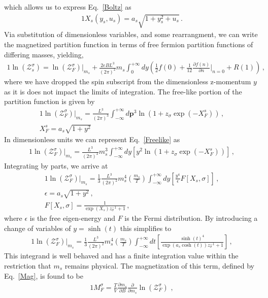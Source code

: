 \documentclass[
aps,
pra,
showpacs,
preprintnumbers,
amsmath,
amssymb,
footinbib
]{revtex4-2}
\newcommand*{\req}[1]{Eq.~{\eqref{#1}}}
\newcommand*{\bb}{\boldsymbol}
\begin{document}
which allows us to express \req{Boltz} as
\begin{alignat}{1}
    \label{UnitlessBoltz} X_{s}(y_{s},u_{s})=a_{s}\sqrt{1+y_{s}^{2}+u_{s}}\,.
\end{alignat}
Via substitution of dimensionless variables, and some rearrangment, we can write the magnetized partition function in terms of free fermion partition functions of differing masses, yielding,
\begin{alignat}{1}
    \label{Equality} \ln\left(\mathcal{Z}^{\sigma}_{s}\right) = \ln\left(\mathcal{Z}^{\sigma}_{F}\right)|_{m_{s}} + \frac{2eBL^{3}}{(2\pi)^{2}}m_{s}\int_{0}^{+\infty}dy\left(\frac{1}{2}f(0) + \frac{1}{12}\frac{\partial f(n)}{\partial n}\bigg\rvert_{n=0} + R(1)\right)\,,
\end{alignat}
where we have dropped the spin subscript from the dimensionless z-momentum $y$ as it is does not impact the limits of integration. The free-like portion of the partition function is given by
\begin{alignat}{1}
    \label{Freelike} \ln\left(\mathcal{Z}^{\sigma}_{F}\right)|_{m_{s}}=\frac{L^{3}}{(2\pi)^{3}}\int^{+\infty}_{-\infty}d\bb{p}^{3}\ln\left(1+z_{\sigma}\exp(-X^{s}_{F})\right)\,,\\
    \label{FreelikeHam} X^{s}_{F} = a_{s}\sqrt{1+y^{2}}
\end{alignat}
In dimensionless units we can represent \req{Freelike} as
\begin{alignat}{1}
    \label{FreelikeAlt} \ln\left(\mathcal{Z}^{\sigma}_{F}\right)|_{m_{s}}=\frac{L^{3}}{(2\pi)^{2}}m_{s}^{3}\int^{+\infty}_{-\infty}dy\left[y^{2}\ln\left(1+z_{\sigma}\exp(-X^{s}_{F})\right)\right]\,,
\end{alignat}
Integrating by parts, we arrive at
\begin{alignat}{1}
    \label{FreelikeParts} \ln\left(\mathcal{Z}^{\sigma}_{F}\right)|_{m_{s}}=\frac{1}{3}\frac{L^{3}}{(2\pi)^{2}}m_{s}^{4}\left(\frac{m_{s}}{T}\right)\int^{+\infty}_{-\infty}dy\left[\frac{y^{4}}{\epsilon}F[X_{s},\sigma]\right]\,,\\
    \label{EigenE} \epsilon = a_{s}\sqrt{1+y^{2}}\,,\\
    \label{FermD} F[X_{s},\sigma] = \frac{1}{\exp(X_{s})z_{\sigma}^{-1}+1}\,,
\end{alignat}
where $\epsilon$ is the free eigen-energy and $F$ is the Fermi distribution. By introducing a change of variables of $y=\sinh(t)$ this simplifies to
\begin{alignat}{1}
    \label{FreelikeFinal} \ln\left(\mathcal{Z}^{\sigma}_{F}\right)|_{m_{s}}=\frac{1}{3}\frac{L^{3}}{(2\pi)^{2}}m_{s}^{4}\left(\frac{m_{s}}{T}\right)\int^{+\infty}_{-\infty}dt\left[\frac{\sinh(t)^{4}}{\exp(a_{s}\cosh(t))z_{\sigma}^{-1}+1}\right]\,,
\end{alignat}
This integrand is well behaved and has a finite integration value within the restriction that $m_{s}$ remains physical. The magnetization of this term, defined by \req{Mag}, is found to be
\begin{alignat}{1}
    \label{FreelikeMag} M_{F}^{\sigma}=\frac{T}{V}\frac{\partial m_{s}}{\partial B}\frac{\partial}{\partial m_{s}}\ln(\mathcal{Z}_{F}^{\sigma})\,\,,
\end{alignat}
\end{document}
